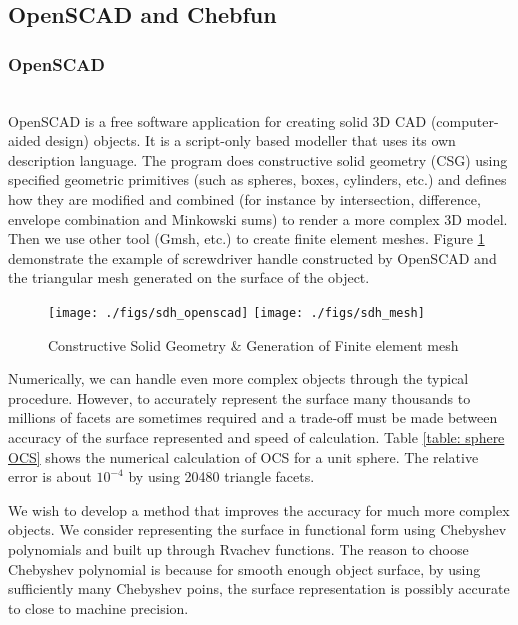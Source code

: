 \documentclass[11pt]{amsart}
\theoremstyle{definition}
\begin{document}
\subsection{OpenSCAD and Chebfun}
\subsubsection{OpenSCAD}~\\
OpenSCAD is a free software application for creating solid 3D CAD (computer-aided design) objects. It is a script-only based modeller that uses its own description language. The program does constructive solid geometry (CSG) using specified geometric primitives (such as spheres, boxes, cylinders, etc.) and defines how they are modified and combined (for instance by intersection, difference, envelope combination and Minkowski sums) to render a more complex 3D model. Then we use other tool (Gmsh, etc.) to create finite element meshes. Figure \ref{fig:sdh_openscad} demonstrate the example of screwdriver handle constructed by OpenSCAD and the triangular mesh generated on the surface of the object.
\begin{figure}[H]   	
\centerline{\texttt{[image: ./figs/sdh\_openscad]}
     	\hspace{-6pt}
		\texttt{[image: ./figs/sdh\_mesh]}}
     	\hspace{-6pt}
		\caption{Constructive Solid Geometry \& Generation of Finite element mesh ~\cite{mesh}}
        \label{fig:sdh_openscad}
\end{figure}

Numerically, we can handle even more complex objects through the typical procedure. However, to accurately represent the surface many thousands to millions of facets are sometimes required and a trade-off must be made between accuracy of the surface represented and speed of calculation. Table \ref{table: sphere OCS} shows the numerical calculation of OCS for a unit sphere. The relative error is about $10^{-4}$ by using 20480 triangle facets.  

We wish to develop a method that improves the accuracy for much more complex objects. We consider representing the surface in functional form using Chebyshev polynomials and built up through Rvachev functions. The reason to choose Chebyshev polynomial is because for smooth enough object surface, by using sufficiently many Chebyshev poins, the surface representation is possibly accurate to close to machine precision.
\end{document}
